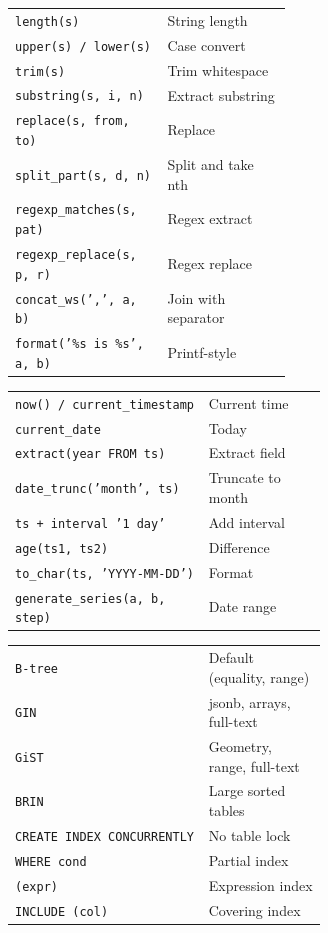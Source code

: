\documentclass[10pt]{extarticle}
\begin{document}
\begin{multicols}{2}
\begin{tabularx}{\linewidth}{@{}>{\raggedright\arraybackslash}p{0.55\linewidth}@{\enspace}Y@{}}
\texttt{length(s)}                   & String length \\
\texttt{upper(s) / lower(s)}        & Case convert \\
\texttt{trim(s)}                     & Trim whitespace \\
\texttt{substring(s, i, n)}         & Extract substring \\
\texttt{replace(s, from, to)}       & Replace \\
\texttt{split\_part(s, d, n)}       & Split and take nth \\
\texttt{regexp\_matches(s, pat)}    & Regex extract \\
\texttt{regexp\_replace(s, p, r)}   & Regex replace \\
\texttt{concat\_ws(',', a, b)}      & Join with separator \\
\texttt{format('\%s is \%s', a, b)} & Printf-style \\
\end{tabularx}

\begin{tabularx}{\linewidth}{@{}>{\raggedright\arraybackslash}p{0.62\linewidth}@{\enspace}Y@{}}
\texttt{now() / current\_timestamp} & Current time \\
\texttt{current\_date}               & Today \\
\texttt{extract(year FROM ts)}      & Extract field \\
\texttt{date\_trunc('month', ts)}   & Truncate to month \\
\texttt{ts + interval '1 day'}      & Add interval \\
\texttt{age(ts1, ts2)}              & Difference \\
\texttt{to\_char(ts, 'YYYY-MM-DD')} & Format \\
\texttt{generate\_series(a, b, step)} & Date range \\
\end{tabularx}

\begin{tabularx}{\linewidth}{@{}>{\raggedright\arraybackslash}p{0.62\linewidth}@{\enspace}Y@{}}
\texttt{B-tree}                      & Default (equality, range) \\
\texttt{GIN}                         & jsonb, arrays, full-text \\
\texttt{GiST}                        & Geometry, range, full-text \\
\texttt{BRIN}                        & Large sorted tables \\
\texttt{CREATE INDEX CONCURRENTLY}  & No table lock \\
\texttt{WHERE cond}                  & Partial index \\
\texttt{(expr)}                      & Expression index \\
\texttt{INCLUDE (col)}              & Covering index \\
\end{tabularx}


\end{multicols}
\end{document}
